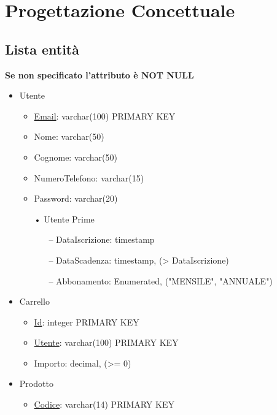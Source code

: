 \documentclass[11pt]{article}
\begin{document}
\section{Progettazione Concettuale}

\subsection{Lista entità}

\textbf{Se non specificato l'attributo è NOT NULL}
\begin{itemize}
    \item Utente
    \begin{itemize}
        \item \underline{Email}: varchar(100) PRIMARY KEY
        \item Nome: varchar(50)
        \item Cognome: varchar(50)
        \item NumeroTelefono: varchar(15)
        \item Password: varchar(20)
        \item[•] Utente Prime
        \begin{itemize}
            \item[–] DataIscrizione: timestamp
            \item[–] DataScadenza: timestamp, (\textgreater{} DataIscrizione)
            \item[–] Abbonamento: Enumerated, ("MENSILE", "ANNUALE")
        \end{itemize}
    \end{itemize}
    \item Carrello
    \begin{itemize}
        \item \underline{Id}: integer PRIMARY KEY
        \item \underline{Utente}: varchar(100) PRIMARY KEY
        \item Importo: decimal, (\textgreater{}= 0)
    \end{itemize}
    \item Prodotto
    \begin{itemize}
        \item \underline{Codice}: varchar(14) PRIMARY KEY

\end{itemize}
\end{itemize}
\end{document}
